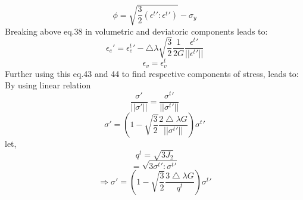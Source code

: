 \documentclass{article}
\begin{document}
\begin{equation}
    \phi = \sqrt{\frac{3}{2}(\epsilon^{t}\prime:\epsilon^{t}\prime)}-\sigma_{y}
\end{equation}
Breaking above eq.38 in volumetric and deviatoric components leads to:
\begin{equation}
    \epsilon_{e}\prime=\epsilon^{t}_{e}\prime -\bigtriangleup\lambda \sqrt{\frac{3}{2}}\frac{1}{2G}\frac{\epsilon^{t}\prime}{||\epsilon^{t}\prime||}
\end{equation}
\begin{equation}
    \epsilon_{v}=\epsilon^{t}_{v}
\end{equation}
Further using this eq.43 and 44 to find respective components of stress, leads to:\\
By using linear relation
\begin{equation}
    \frac{\sigma\prime}{||\sigma\prime||}=\frac{\sigma^{t}\prime}{||\sigma^{t}\prime||}
\end{equation}
\begin{equation}
  \sigma\prime=(1-\sqrt{\frac{3}{2}} \frac{2\bigtriangleup\lambda G}{||\sigma^{t}\prime||})  \sigma^{t}\prime
\end{equation}let,
\begin{equation}
    q^{t}=\sqrt{3J_{2}}
\end{equation}
\begin{equation}
    =\sqrt{3 \sigma^{t}\prime:\sigma^{t}\prime}
\end{equation}
\begin{equation}
    \Rightarrow \sigma\prime=(1-\sqrt{\frac{3}{2}} \frac{3\bigtriangleup\lambda G}{q^{t}})  \sigma^{t}\prime
\end{equation}
\end{document}
